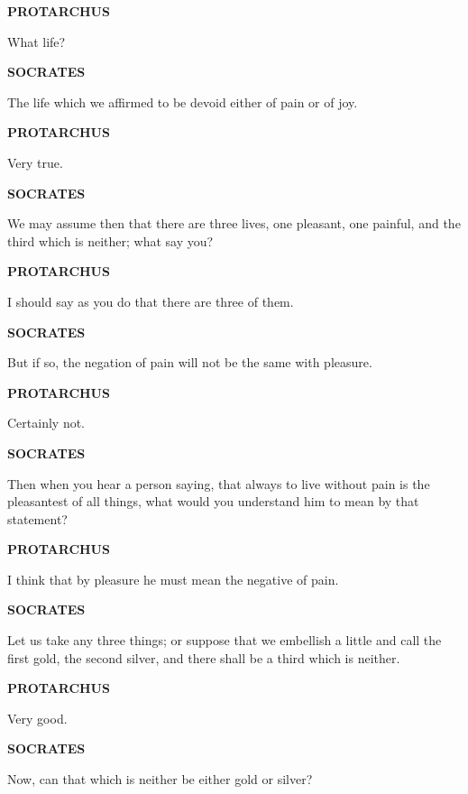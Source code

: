 \documentclass[11pt,letter]{article}
\begin{document}
\par \textbf{PROTARCHUS}
\par   What life?

\par \textbf{SOCRATES}
\par   The life which we affirmed to be devoid either of pain or of joy.

\par \textbf{PROTARCHUS}
\par   Very true.

\par \textbf{SOCRATES}
\par   We may assume then that there are three lives, one pleasant, one painful, and the third which is neither; what say you?

\par \textbf{PROTARCHUS}
\par   I should say as you do that there are three of them.

\par \textbf{SOCRATES}
\par   But if so, the negation of pain will not be the same with pleasure.

\par \textbf{PROTARCHUS}
\par   Certainly not.

\par \textbf{SOCRATES}
\par   Then when you hear a person saying, that always to live without pain is the pleasantest of all things, what would you understand him to mean by that statement?

\par \textbf{PROTARCHUS}
\par   I think that by pleasure he must mean the negative of pain.

\par \textbf{SOCRATES}
\par   Let us take any three things; or suppose that we embellish a little and call the first gold, the second silver, and there shall be a third which is neither.

\par \textbf{PROTARCHUS}
\par   Very good.

\par \textbf{SOCRATES}
\par   Now, can that which is neither be either gold or silver?
\end{document}
